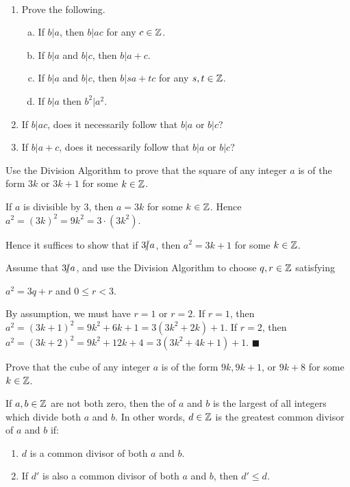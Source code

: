 \documentclass[11pt,fleqn,dvipsnames,usenames]{article}
\newcommand{\p}{\noindent}
\newcommand{\ENDPRF}{\hfill $\blacksquare$}
\begin{document}
\begin{exercises}\label{divisibilityproperties}~
\begin{enumerate}
\item Prove the following.
\begin{enumerate}[(a)]
\item If $b|a$, then $b|ac$ for any $c\in\mathbb{Z}$.
\item If $b|a$ and $b|c$, then $b|a+c$.
\item If $b|a$ and $b|c$, then $b|sa+tc$ for any $s,t\in\mathbb{Z}$.
\item If $b|a$ then $b^2|a^2$.
\end{enumerate}
\item If $b|ac$, does it necessarily follow that $b|a$ or $b|c$?
\item If $b|a+c$, does it necessarily follow that $b|a$ or $b|c$? 
\end{enumerate}
\end{exercises}
%
\begin{example}
Use the Division Algorithm to prove that the square of any integer $a$ is of the form $3k$ or $3k+1$ for some $k\in\mathbb{Z}$.
\end{example}

\solution If $a$ is divisible by $3$, then $a = 3k$ for some $k\in\mathbb{Z}$.  Hence $a^2 = (3k)^2 = 9k^2 =  3\cdot (3k^2)$.
\vsp

\p Hence it suffices to show that if $3|\kern-0.9ex{/} a$, then $a^2 = 3k +1$ for some $k\in\mathbb{Z}$.
\vsp

\p Assume that $3|\kern-0.9ex{/} a$, and use the Division Algorithm to choose $q,r\in\mathbb{Z}$ satisfying
\begin{center}
$a^2 = 3q + r$ and $0 \leq r < 3$.
\end{center}
\p By assumption, we must have $r=1$ or $r=2$.  If $r = 1$, then $a^2 = (3k+1)^2 = 9k^2 + 6k + 1 = 3(3k^2 + 2k) + 1$.  If $r = 2$, then $a^2 = (3k+2)^2 = 9k^2 + 12k + 4 = 3(3k^2 + 4k + 1) + 1$. \ENDPRF
\vsp

\begin{exercise}
Prove that the cube of any integer $a$ is of the form $9k, 9k+1$, or $9k+8$ for some $k\in\mathbb{Z}$.
\end{exercise}

\begin{definition} If $a,b\in\mathbb{Z}$ are not both zero, then the  of $a$ and $b$ is the largest of all integers which divide both $a$ and $b$.  In other words, $d\in\mathbb{Z}$ is the greatest common divisor of $a$ and $b$ if:
\begin{enumerate}[(1)]
\item $d$ is a common divisor of both $a$ and $b$.
\item If $d'$ is also a common divisor of both $a$ and $b$, then $d'\leq d$.
\end{enumerate}
\end{definition}
\vsp
\end{document}
